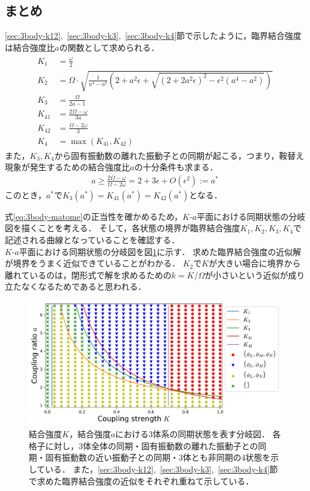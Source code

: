 \documentclass[../main]{subfiles}
\begin{document}
    \subsection{まとめ}
    \ref{sec:3body-k12},\ \ref{sec:3body-k3},\ \ref{sec:3body-k4}節で示したように，臨界結合強度は結合強度比$a$の関数として求められる．
    \begin{align}
        \label{eq:3body-matome}
        \begin{split}
            K_1&=\frac{\omega}{2}\\
            K_2&=\Omega\cdot\sqrt{\frac{1}{a^4-a^2}\left(2+a^2\epsilon+\sqrt{(2+2a^2\epsilon)^2-\epsilon^2(a^4-a^2)}\right)}\\
            K_3&=\frac{\Omega}{2a-1}\\
            K_{41}&=\frac{2\Omega-\omega}{3a}\\
            K_{42}&=\frac{\Omega-2\omega}{3}\\
            K_4&=\max\left(K_{41},K_{42}\right)
        \end{split}
    \end{align}
    また，$K_3,K_4$から固有振動数の離れた振動子との同期が起こる，つまり，鞍替え現象が発生するための結合強度比$a$の十分条件も求まる．
    \begin{align*}
        a\geq \frac{2\Omega-\omega}{\Omega-2\omega}= 2+3\epsilon+O(\epsilon^2):=a^\ast    
    \end{align*}
    このとき，$a^\ast$で$K_{3}(a^\ast)=K_{41}(a^\ast)=K_{42}(a^\ast)$となる．
    
    式\eqref{eq:3body-matome}の正当性を確かめるため，$K$-$a$平面における同期状態の分岐図を描くことを考える．
    そして，各状態の境界が臨界結合強度$K_1,K_2,K_3,K_4$で記述される曲線となっていることを確認する．\\
    $K$-$a$平面における同期状態の分岐図を図\ref{fig:3body-phase}に示す．
    求めた臨界結合強度の近似解が境界をうまく近似できていることがわかる．
    $K_2$で$K$が大きい場合に境界から離れているのは，閉形式で解を求めるための$k=K/\Omega$が小さいという近似が成り立たなくなるためであると思われる．

    \begin{figure}[t]
    \centering
    \includegraphics[width=120mm]{images/three-body-phase.pdf}
    \centering
    \caption{結合強度$K$，結合強度$a$における3体系の同期状態を表す分岐図．
    各格子に対し，3体全体の同期・固有振動数の離れた振動子との同期・固有振動数の近い振動子との同期・3体とも非同期の4状態を示している．
    また，\ref{sec:3body-k12},\ \ref{sec:3body-k3},\ \ref{sec:3body-k4}節で求めた臨界結合強度の近似をそれぞれ重ねて示している．
    }
    \label{fig:3body-phase}
    \end{figure}
\end{document}
